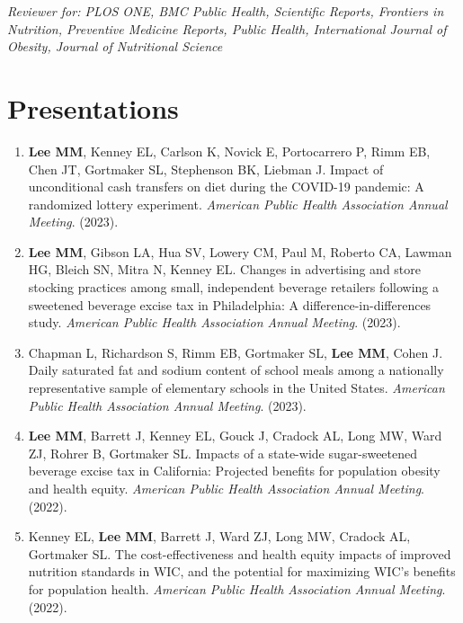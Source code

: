 \documentclass{cv_style}
\begin{document}
\parskip -5pt 
\nocite{*}
\printbibliography[title=Publications]

\vspace{2em}

\textit{Reviewer for: PLOS ONE, BMC Public Health, Scientific Reports, Frontiers in Nutrition, Preventive Medicine Reports, Public Health, International Journal of Obesity, Journal of Nutritional Science}


\section{Presentations}
\begin{enumerate}[leftmargin = 2em]
    \item \textbf{Lee MM}, Kenney EL, Carlson K, Novick E, Portocarrero P, Rimm EB, Chen JT, Gortmaker SL, Stephenson BK, Liebman J. Impact of unconditional cash transfers on diet during the COVID-19 pandemic: A randomized lottery experiment. \textit{American Public Health Association Annual Meeting}. (2023). 
    \item \parskip 1pt \textbf{Lee MM}, Gibson LA, Hua SV, Lowery CM, Paul M, Roberto CA, Lawman HG, Bleich SN, Mitra N, Kenney EL. Changes in advertising and store stocking practices among small, independent beverage retailers following a sweetened beverage excise tax in Philadelphia: A difference-in-differences study. \textit{American Public Health Association Annual Meeting}. (2023).  
    \item \parskip 1pt Chapman L, Richardson S, Rimm EB, Gortmaker SL, \textbf{Lee MM}, Cohen J. Daily saturated fat and sodium content of school meals among a nationally representative sample of elementary schools in the United States. \textit{American Public Health Association Annual Meeting}. (2023). 
    \item \parskip 1pt \textbf{Lee MM}, Barrett J, Kenney EL, Gouck J, Cradock AL, Long MW, Ward ZJ, Rohrer B, Gortmaker SL. Impacts of a state-wide sugar-sweetened beverage excise tax in California: Projected benefits for population obesity and health equity. \textit{American Public Health Association Annual Meeting}. (2022).
    \item \parskip 1pt Kenney EL, \textbf{Lee MM}, Barrett J, Ward ZJ, Long MW, Cradock AL, Gortmaker SL. The cost-effectiveness and health equity impacts of improved nutrition standards in WIC, and the potential for maximizing WIC’s benefits for population health. \textit{American Public Health Association Annual Meeting}. (2022).
\end{enumerate}
\end{document}
